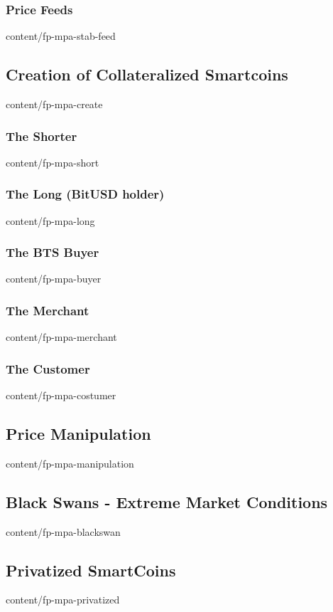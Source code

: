 \documentclass[conference,final,10pt,a4paper]{IEEEtran}
\begin{document}
\subsubsection { Price Feeds                                     }  { content/fp-mpa-stab-feed       } 

\subsection    { Creation of Collateralized Smartcoins           }  { content/fp-mpa-create          } 
\subsubsection { The Shorter                                     }  { content/fp-mpa-short           } 
\subsubsection { The Long (BitUSD holder)                        }  { content/fp-mpa-long            } 
\subsubsection { The BTS Buyer                                   }  { content/fp-mpa-buyer           } 
\subsubsection { The Merchant                                    }  { content/fp-mpa-merchant        } 
\subsubsection { The Customer                                    }  { content/fp-mpa-costumer        } 
\subsection    { Price Manipulation                              }  { content/fp-mpa-manipulation    } 
\subsection    { Black Swans - Extreme Market Conditions         }  { content/fp-mpa-blackswan       } 
\subsection    { Privatized SmartCoins                           }  { content/fp-mpa-privatized      } 
\end{document}
